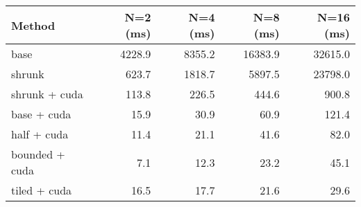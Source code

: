 \begin{tabular}{lrrrr}
\hline
 Method         &   N=2 (ms) &   N=4 (ms) &   N=8 (ms) &   N=16 (ms) \\
\hline
 base           &     4228.9 &     8355.2 &    16383.9 &     32615.0 \\
 shrunk         &      623.7 &     1818.7 &     5897.5 &     23798.0 \\
 shrunk + cuda  &      113.8 &      226.5 &      444.6 &       900.8 \\
 base + cuda    &       15.9 &       30.9 &       60.9 &       121.4 \\
 half + cuda    &       11.4 &       21.1 &       41.6 &        82.0 \\
 bounded + cuda &        7.1 &       12.3 &       23.2 &        45.1 \\
 tiled + cuda   &       16.5 &       17.7 &       21.6 &        29.6 \\
\hline
\end{tabular}
